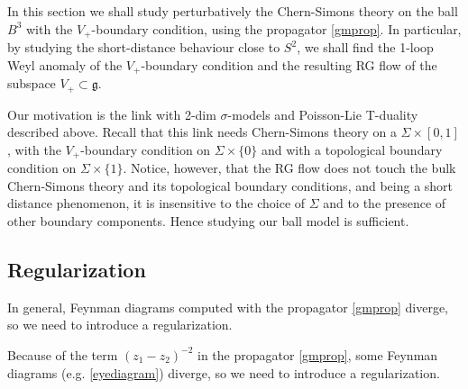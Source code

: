 \documentclass[a4paper]{amsart}
\theoremstyle{plain}
\theoremstyle{definition}
\newcommand{\g}{\mathfrak{g}}
\newcommand{\h}{\mathfrak{h}}
\newcommand{\cf}{\mathsf{Conf}}
\begin{document}
 In this section we shall study perturbatively the Chern-Simons theory on the ball $B^3$ with the $V_+$-boundary condition, using the propagator \eqref{gmprop}. In particular, by studying  the short-distance behaviour close to $S^2$, we shall find the 1-loop Weyl anomaly of the $V_+$-boundary condition and the resulting RG flow of the subspace $V_+\subset\g$.
 
Our motivation is the link with 2-dim $\sigma$-models and Poisson-Lie T-duality described above. Recall that this link needs Chern-Simons theory on a $\Sigma\times[0,1]$, with the $V_+$-boundary condition on $\Sigma\times\{0\}$ and with a topological boundary condition on $\Sigma\times\{1\}$. Notice, however, that the RG flow does not touch the bulk Chern-Simons theory and its topological boundary conditions, and being a short distance phenomenon, it is insensitive to the choice of $\Sigma$ and to the presence of other boundary components. Hence studying our ball model is sufficient.




\subsection{Regularization}

{\color{gray} In general, Feynman diagrams computed with the propagator \eqref{gmprop} diverge, so we need to introduce a regularization.}

{\color{teal} Because of the term $(z_{1}-z_{2})^{-2}$ in the propagator \eqref{gmprop}, some Feynman diagrams (e.g. \eqref{eyediagram}) diverge, so we need to introduce a regularization.}
\end{document}
